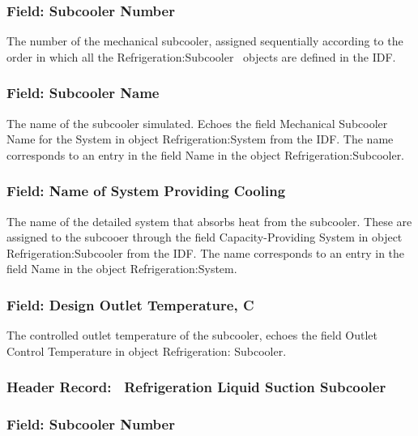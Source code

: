 \subsubsection{Field: Subcooler Number}\label{field-subcooler-number-1}

The number of the mechanical subcooler, assigned sequentially according to the order in which all the Refrigeration:Subcooler~ objects are defined in the IDF.

\subsubsection{Field: Subcooler Name}\label{field-subcooler-name-1}

The name of the subcooler simulated. Echoes the field Mechanical Subcooler Name for the System in object Refrigeration:System from the IDF. The name corresponds to an entry in the field Name in the object Refrigeration:Subcooler.

\subsubsection{Field: Name of System Providing Cooling}\label{field-name-of-system-providing-cooling}

The name of the detailed system that absorbs heat from the subcooler. These are assigned to the subcooer through the field Capacity-Providing System in object Refrigeration:Subcooler from the IDF. The name corresponds to an entry in the field Name in the object Refrigeration:System.

\subsubsection{Field: Design Outlet Temperature, C}\label{field-design-outlet-temperature-c}

The controlled outlet temperature of the subcooler, echoes the field Outlet Control Temperature in object Refrigeration: Subcooler.

\subsubsection{Header Record:~ Refrigeration Liquid Suction Subcooler}\label{header-record-refrigeration-liquid-suction-subcooler}

\subsubsection{Field: Subcooler Number}\label{field-subcooler-number-2}

